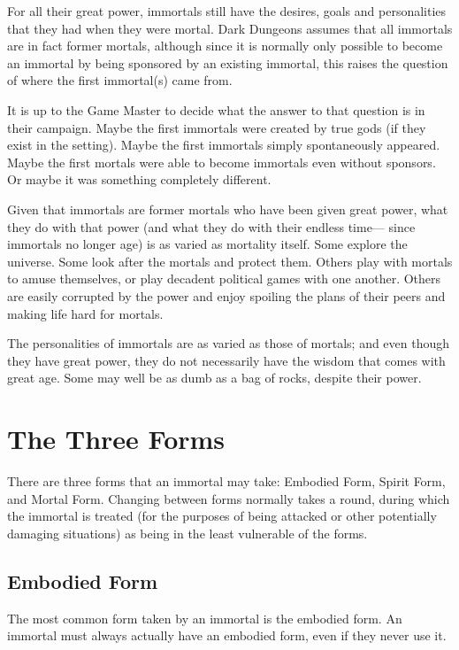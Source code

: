 \begin{multicols*}{2}
For all their great power, immortals still have the desires, goals and personalities that they had when they were mortal. Dark Dungeons assumes that all immortals are in fact former mortals, although since it is normally only possible to become an immortal by being sponsored by an existing immortal, this raises the question of where the first immortal(s) came from.

It is up to the Game Master to decide what the answer to that question is in their campaign. Maybe the first immortals were created by true gods (if they exist in the setting). Maybe the first immortals simply spontaneously appeared. Maybe the first mortals were able to become immortals even without sponsors. Or maybe it was something completely different.

Given that immortals are former mortals who have been given great power, what they do with that power (and what they do with their endless time— since immortals no longer age) is as varied as mortality itself. Some explore the universe. Some look after the mortals and protect them. Others play with mortals to amuse themselves, or play decadent political games with one another. Others are easily corrupted by the power and enjoy spoiling the plans of their peers and making life hard for mortals. 

The personalities of immortals are as varied as those of mortals; and even though they have great power, they do not necessarily have the wisdom that comes with great age. Some may well be as dumb as a bag of rocks, despite their power.

\section{The Three Forms}
There are three forms that an immortal may take: Embodied Form, Spirit Form, and Mortal Form. Changing between forms normally takes a round, during which the immortal is treated (for the purposes of being attacked or other potentially damaging situations) as being in the least vulnerable of the forms.

\subsection{Embodied Form}\label{sec:Embodied Form}
The most common form taken by an immortal is the embodied form. An immortal must always actually have an embodied form, even if they never use it.


\end{multicols*}
